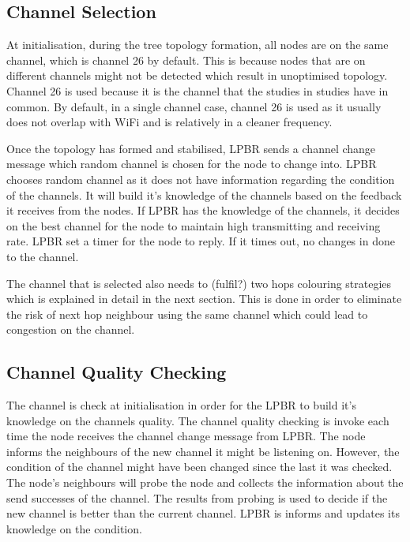 \subsection{Channel Selection}


At initialisation, during the tree topology formation, all nodes are on the same channel, which is channel 26 by default. This is because nodes that are on different channels might not be detected which result in unoptimised topology. Channel 26 is used because it is the channel that the studies in \cite{chrysso}\cite{micmac}\cite{watteyne} studies have in common. By default, in a single channel case, channel 26 is used as it usually does not overlap with WiFi and is relatively in a cleaner frequency. 

Once the topology has formed and stabilised, LPBR sends a channel change message which random channel is chosen for the node to change into. LPBR chooses random channel as it does not have information regarding the condition of the channels. It will build it's knowledge of the channels based on the feedback it receives from the nodes. If LPBR has the knowledge of the channels, it decides on the best channel for the node to maintain high transmitting and receiving rate. LPBR set a timer for the node to reply. If it times out, no changes in done to the channel.

The channel that is selected also needs to (fulfil?) two hops colouring strategies which is explained in detail in the next section. This is done in order to eliminate the risk of next hop neighbour using the same channel which could lead to congestion on the channel.




\subsection{Channel Quality Checking}

The channel is check at initialisation in order for the LPBR to build it's knowledge on the channels quality. The channel quality checking is invoke each time the node receives the channel change message from LPBR. The node informs the neighbours of the new channel it might be listening on. However, the condition of the channel might have been changed since the last it was checked. The node's neighbours will probe the node and collects the information about the send successes of the channel. The results from probing is used to decide if the new channel is better than the current channel. LPBR is informs and updates its knowledge on the condition. 

